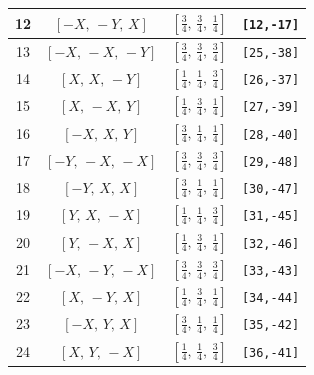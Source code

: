 \documentclass[fleqn,8pt]{jsarticle}
\begin{document}
\begin{longtable}{cccc}
12 & $\left[ - X,\, - Y,\, X \right]$ & $\left[ \frac{3}{4},\, \frac{3}{4},\, \frac{1}{4} \right]$ & {\tt [12,-17]} \\ \hline
13 & $\left[ - X,\, - X,\, - Y \right]$ & $\left[ \frac{3}{4},\, \frac{3}{4},\, \frac{3}{4} \right]$ & {\tt [25,-38]} \\ \hline
14 & $\left[ X,\, X,\, - Y \right]$ & $\left[ \frac{1}{4},\, \frac{1}{4},\, \frac{3}{4} \right]$ & {\tt [26,-37]} \\ \hline
15 & $\left[ X,\, - X,\, Y \right]$ & $\left[ \frac{1}{4},\, \frac{3}{4},\, \frac{1}{4} \right]$ & {\tt [27,-39]} \\ \hline
16 & $\left[ - X,\, X,\, Y \right]$ & $\left[ \frac{3}{4},\, \frac{1}{4},\, \frac{1}{4} \right]$ & {\tt [28,-40]} \\ \hline
17 & $\left[ - Y,\, - X,\, - X \right]$ & $\left[ \frac{3}{4},\, \frac{3}{4},\, \frac{3}{4} \right]$ & {\tt [29,-48]} \\ \hline
18 & $\left[ - Y,\, X,\, X \right]$ & $\left[ \frac{3}{4},\, \frac{1}{4},\, \frac{1}{4} \right]$ & {\tt [30,-47]} \\ \hline
19 & $\left[ Y,\, X,\, - X \right]$ & $\left[ \frac{1}{4},\, \frac{1}{4},\, \frac{3}{4} \right]$ & {\tt [31,-45]} \\ \hline
20 & $\left[ Y,\, - X,\, X \right]$ & $\left[ \frac{1}{4},\, \frac{3}{4},\, \frac{1}{4} \right]$ & {\tt [32,-46]} \\ \hline
21 & $\left[ - X,\, - Y,\, - X \right]$ & $\left[ \frac{3}{4},\, \frac{3}{4},\, \frac{3}{4} \right]$ & {\tt [33,-43]} \\ \hline
22 & $\left[ X,\, - Y,\, X \right]$ & $\left[ \frac{1}{4},\, \frac{3}{4},\, \frac{1}{4} \right]$ & {\tt [34,-44]} \\ \hline
23 & $\left[ - X,\, Y,\, X \right]$ & $\left[ \frac{3}{4},\, \frac{1}{4},\, \frac{1}{4} \right]$ & {\tt [35,-42]} \\ \hline
24 & $\left[ X,\, Y,\, - X \right]$ & $\left[ \frac{1}{4},\, \frac{1}{4},\, \frac{3}{4} \right]$ & {\tt [36,-41]} \\
\end{longtable}
\renewcommand{\arraystretch}{1.2}
\end{document}
